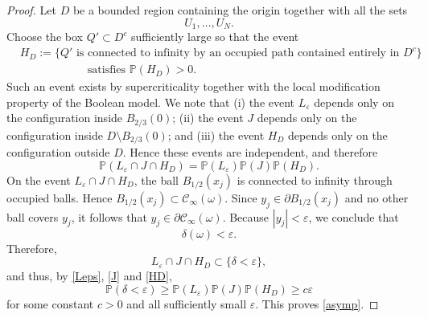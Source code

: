 \documentclass[10pt,a4paper]{amsart}
\renewcommand{\P}{\mathbb P}
\begin{document}
\begin{proof}
\medskip

Let $D$ be a bounded region containing the origin together with all the sets
\[
U_1,\dots,U_N.
\]
Choose the box
$Q'\subset D^c$
sufficiently large so that the event
\begin{equation}\label{HD}
\begin{aligned}
&H_D
:=
\bigg\{
Q'
\text{ is connected to infinity by an occupied path contained entirely in }D^c
\bigg\} \\
&\qquad\qquad\qquad \mbox{satisfies $\P(H_D)>0$}. 
\end{aligned}
\end{equation}
Such an event exists by supercriticality together with the local modification property of the Boolean model. We note that (i) the event $L_\varepsilon$ depends only on the configuration inside
$B_{2/3}(0)$; (ii)
the event $J$ depends only on the configuration inside
$D\setminus B_{2/3}(0)$;
and (iii) the event $H_D$ depends only on the configuration outside $D$.
Hence these events are independent, and therefore
\[
\P(L_\varepsilon\cap J\cap H_D)
=
\P(L_\varepsilon)\P(J)\P(H_D).
\]
On the event
$L_\varepsilon\cap J\cap H_D$,
the ball $B_{1/2}(x_j)$
is connected to infinity through occupied balls. Hence
$B_{1/2}(x_j)\subset\mathcal C_\infty(\omega)$.
Since $y_j\in\partial B_{1/2}(x_j)$
and no other ball covers $y_j$, it follows that
$y_j\in\partial\mathcal C_\infty(\omega)$.
Because $|y_j|<\varepsilon$,
we conclude that
\[
\delta(\omega)<\varepsilon.
\]
Therefore,
\[
L_\varepsilon\cap J\cap H_D
\subset
\{\delta<\varepsilon\},
\]
and thus, by \eqref{Leps}, \eqref{J} and \eqref{HD}, 
\[
\P(\delta<\varepsilon)
\ge
\P(L_\varepsilon)\P(J)\P(H_D)
\ge
c\varepsilon
\]
for some constant $c>0$ and all sufficiently small $\varepsilon$. This proves \eqref{asymp}.
\end{proof}
\end{document}
